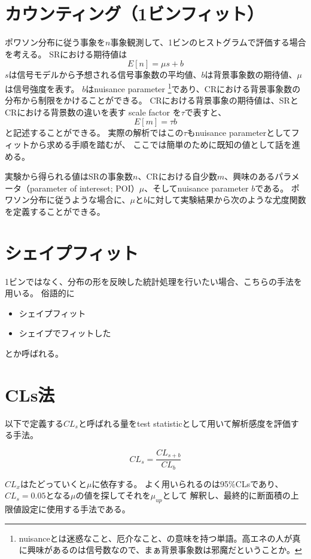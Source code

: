 \documentclass[oneside, uplatex]{jsbook}
\begin{document}
\section{カウンティング（1ビンフィット）}
ポワソン分布に従う事象を$n$事象観測して、1ビンのヒストグラムで評価する場合を考える。
SRにおける期待値は
\begin{equation}
E[n] = \mu s + b
\end{equation}
$s$は信号モデルから予想される信号事象数の平均値、$b$は背景事象数の期待値、$\mu$は信号強度を表す。
$b$はnuisance parameter \footnote{nuisanceとは迷惑なこと、厄介なこと、の意味を持つ単語。高エネの人が真に興味があるのは信号数なので、まぁ背景事象数は邪魔だということか。}であり、CRにおける背景事象数の分布から制限をかけることができる。
CRにおける背景事象の期待値は、SRとCRにおける背景数の違いを表す scale factor を$\tau$で表すと、
\begin{equation}
E[m] = \tau b
\end{equation}
と記述することができる。
実際の解析ではこの$\tau$もnuisance parameterとしてフィットから求める手順を踏むが、
ここでは簡単のために既知の値として話を進める。

実験から得られる値はSRの事象数$n$、CRにおける自少数$m$、興味のあるパラメータ（parameter of intereset; POI）$\mu$、そしてnuisance parameter $b$である。
ポワソン分布に従うような場合に、$\mu$と$b$に対して実験結果から次のような尤度関数を定義することができる。


\section{シェイプフィット}
1ビンではなく、分布の形を反映した統計処理を行いたい場合、こちらの手法を用いる。
俗語的に
\begin{itemize}
  \item シェイプフィット
  \item シェイプでフィットした
\end{itemize}
とか呼ばれる。

\section{CLs法}
以下で定義する$CL_s$と呼ばれる量をtest statisticとして用いて解析感度を評価する手法。

\begin{equation}
CL_s = \frac{CL_{s+b}}{CL_b}
\end{equation}

$CL_{x}$はたどっていくと$\mu$に依存する。
よく用いられるのは95$\%$CLsであり、$CL_s=0.05$となる$\mu$の値を探してそれを$\mu_{up}$として
解釈し、最終的に断面積の上限値設定に使用する手法である。



\end{document}
